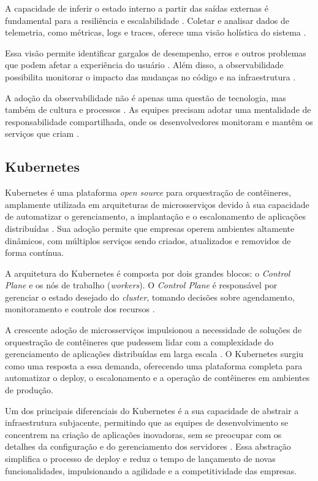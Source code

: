 A capacidade de inferir o estado interno a partir das saídas externas é fundamental para a resiliência e escalabilidade \cite{shekhar2023microservices}. Coletar e analisar dados de telemetria, como métricas, logs e traces, oferece uma visão holística do sistema \cite{observability2023}.

Essa visão permite identificar gargalos de desempenho, erros e outros problemas que podem afetar a experiência do usuário \cite{ahmed2022observability}. Além disso, a observabilidade possibilita monitorar o impacto das mudanças no código e na infraestrutura \cite{shekhar2023microservices}.

A adoção da observabilidade não é apenas uma questão de tecnologia, mas também de cultura e processos \cite{shekhar2023microservices}. As equipes precisam adotar uma mentalidade de responsabilidade compartilhada, onde os desenvolvedores monitoram e mantêm os serviços que criam \cite{observability2023}.

\subsection{Kubernetes}
Kubernetes é uma plataforma \textit{open source} para orquestração de contêineres, amplamente utilizada em arquiteturas de microsserviços devido à sua capacidade de automatizar o gerenciamento, a implantação e o escalonamento de aplicações distribuídas \cite{shekhar2023microservices}. Sua adoção permite que empresas operem ambientes altamente dinâmicos, com múltiplos serviços sendo criados, atualizados e removidos de forma contínua.

A arquitetura do Kubernetes é composta por dois grandes blocos: o \textit{Control Plane} e os nós de trabalho (\textit{workers}). O \textit{Control Plane} é responsável por gerenciar o estado desejado do \textit{cluster}, tomando decisões sobre agendamento, monitoramento e controle dos recursos \cite{shekhar2023microservices}.

A crescente adoção de microsserviços impulsionou a necessidade de soluções de orquestração de contêineres que pudessem lidar com a complexidade do gerenciamento de aplicações distribuídas em larga escala \cite{jamshidi2016systematic}. O Kubernetes surgiu como uma resposta a essa demanda, oferecendo uma plataforma completa para automatizar o deploy, o escalonamento e a operação de contêineres em ambientes de produção.

Um dos principais diferenciais do Kubernetes é a sua capacidade de abstrair a infraestrutura subjacente, permitindo que as equipes de desenvolvimento se concentrem na criação de aplicações inovadoras, sem se preocupar com os detalhes da configuração e do gerenciamento dos servidores \cite{shekhar2023microservices}. Essa abstração simplifica o processo de deploy e reduz o tempo de lançamento de novas funcionalidades, impulsionando a agilidade e a competitividade das empresas.

